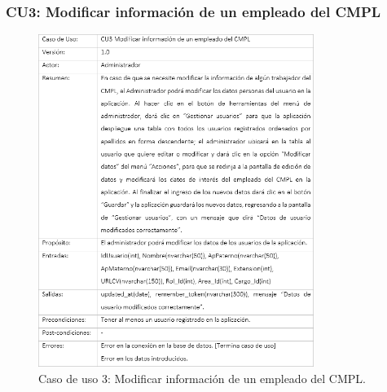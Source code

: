		\subsubsection{CU3: Modificar información de un empleado del CMPL}
			\begin{figure}[htbp!]
				\centering
					\includegraphics[width=0.8\textwidth]{images/CU/CU3}
					\caption{Caso de uso 3: Modificar información de un empleado del CMPL.}
				\label{Tabla}
			\end{figure}
			
